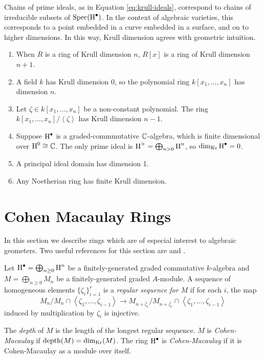 Chains of prime ideals, as in Equation \ref{eq:krull-ideals}, correspond to chains of irreducible subsets of $\operatorname{Spec}(\operatorname{H}^\bullet)$. In the context of algebraic varieties, this corresponds to a point embedded in a curve embedded in a surface, and on to higher dimensions. In this way, Krull dimension agrees with geometric intuition.

\begin{example}
  \begin{enumerate}
  \item When $R$ is a ring of Krull dimension $n$, $R[x]$ is a ring of Krull dimension $n+1$.
  \item A field $k$ has Krull dimension 0, so the polynomial ring $k[x_1,\ldots,x_n]$ has dimension $n$.
  \item Let $\zeta \in k[x_1,\ldots,x_n]$ be a non-constant polynomial. The ring $k[x_1,\ldots,x_n] / \left<\zeta\right>$ has Krull dimension $n-1$.
  \item Suppose $\operatorname{H}^\bullet$ is a graded-commmutative $\mathbb{C}$-algebra, which is finite dimensional over $\operatorname{H}^0 \cong \mathbb{C}$. The only prime ideal is $\operatorname{H}^+ = \bigoplus_{n > 0} \operatorname{H}^n$, so $\dim_{\operatorname{Kr}} \operatorname{H}^\bullet = 0$.
  \item A principal ideal domain has dimension 1.
  \item Any Noetherian ring has finite Krull dimension.
  \end{enumerate}
\end{example}

\section{Cohen Macaulay Rings}
\label{sec:cm}

In this section we describe rings which are of especial interest to algebraic geometers. Two useful references for this section are \cite[\S 5.4]{MR1634407} and \cite[\S 18]{MR1322960}.

\begin{definition}
  Let $\operatorname{H}^\bullet = \bigoplus_{n \geq 0} \operatorname{H}^n$ be a finitely-generated graded commutative $k$-algebra and $M = \bigoplus_{n \geq 0} M_n$ be a finitely-generated graded $A$-module. A sequence of homogeneous elements $\{\zeta_i\}_{i = 1}^r$ is a \emph{regular sequence for $M$} if for each $i$, the map
  \[
    M_n / M_n \cap \left< \zeta_1, \ldots, \zeta_{i-1}\right> \to M_{n+\bar \zeta_i} / M_{n + \bar \zeta_i} \cap \left< \zeta_1, \ldots, \zeta_{i-1}\right>
  \]
  induced by multiplication by $\zeta_i$ is injective.

  The \emph{depth} of $M$ is the length of the longest regular sequence. $M$ is \emph{Cohen-Macaulay} if $\operatorname{depth}(M) = \dim_{\operatorname{Kr}}(M)$.  The ring $\operatorname{H}^\bullet$ is \emph{Cohen-Macaulay} if it is Cohen-Macaulay as a module over itself.
\end{definition}


